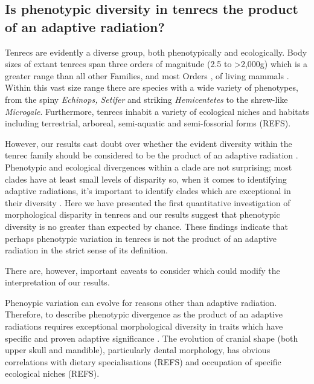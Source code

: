 \documentclass[12pt,a4paper]{article}
\begin{document}
\subsection{Is phenotypic diversity in tenrecs the product of an adaptive radiation?} %

Tenrecs are evidently a diverse group, both phenotypically and ecologically. Body sizes of extant tenrecs span three orders of magnitude (2.5 to \textgreater 2,000g) which is a greater range than all other Families, and most Orders %
, of living mammals \citep{Olson2003}. Within this vast size range there are species with a wide variety of phenotypes, from the spiny \textit{Echinops, Setifer} and striking \textit{Hemicentetes} to the shrew-like  \textit{Microgale}. Furthermore, tenrecs inhabit a variety of ecological niches and habitats including terrestrial, arboreal, semi-aquatic and semi-fossorial forms (REFS).

However, our results cast doubt over whether the evident diversity within the tenrec family should be considered to be the product of an adaptive radiation %
. Phenotypic and ecological divergences within a clade are not surprising; most clades have at least small levels of disparity so, when it comes to identifying adaptive radiations, it's important to identify clades which are exceptional in their diversity \citep{Losos2010a}. Here we have presented the first quantitative investigation of morphological disparity in tenrecs and our results suggest that phenotypic diversity is no greater than expected by chance. These findings indicate that perhaps phenotypic variation in tenrecs is not the product of an adaptive radiation in the strict sense of its definition.

There are, however, important caveats to consider which could modify the interpretation of our results.

Phenoypic variation can evolve for reasons other than adaptive radiation. Therefore, to describe phenotypic divergence as the product of an adaptive radiations requires exceptional morphological diversity in traits which have specific and proven adaptive significance \citep{Losos2010a}. The evolution of cranial shape (both upper skull and mandible), particularly dental morphology, has obvious correlations with dietary specialisations (REFS) and occupation of specific ecological niches (REFS). 
\end{document}
